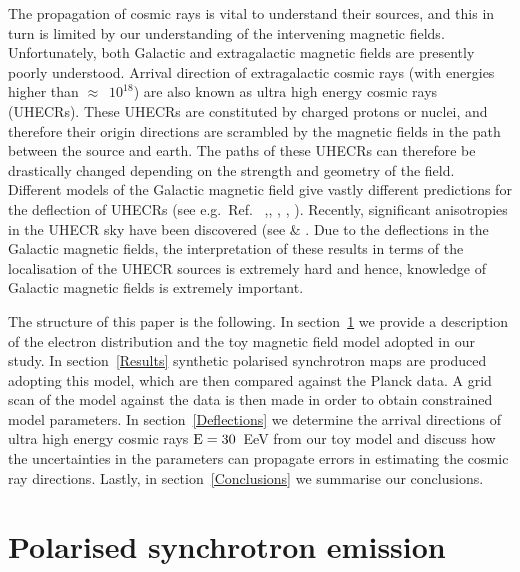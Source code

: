 \documentclass[usenatbib]{mnras}
\begin{document}
The propagation of cosmic rays is vital to understand their sources, and this in turn is limited by our understanding of the intervening magnetic fields. Unfortunately, both Galactic and extragalactic magnetic fields are presently poorly understood. Arrival direction of extragalactic cosmic rays (with energies higher than $\approx$~$10^{18}$) are also known as ultra high energy cosmic rays (UHECRs). These UHECRs are constituted by charged protons or nuclei, and therefore their origin directions are scrambled by the magnetic fields in the path between the source and earth. The paths of these UHECRs can therefore be drastically changed depending on the strength and geometry of the field. Different models of the Galactic magnetic field give vastly different predictions for the deflection of UHECRs (see e.g.~Ref.~ \cite{JF12},\cite{FARRAR_2014}, \cite{PT11_2011}, \cite{Sun_2008}, \cite{Sun_2010}). Recently, significant anisotropies in the UHECR sky have been discovered (see \cite{ICRC_2021} \cite{Auger_Starburst2018} \& \cite{ICRC_2019}. Due to the deflections in the Galactic magnetic fields, the interpretation of these results in terms of the localisation of the UHECR sources is extremely hard and hence, knowledge of Galactic magnetic fields is extremely important. 



The structure of this paper is the following. In section~\ref{Methods} we provide a description of the electron distribution and the toy magnetic field model adopted in our study. In section~\ref{Results} synthetic polarised synchrotron maps are produced adopting this model, which are then compared against the Planck data. A grid scan of the model against the data is then made in order to obtain constrained model parameters. In section~\ref{Deflections} we determine the arrival directions of ultra high energy cosmic rays $\rm E = 30$~EeV from our toy model and discuss how the uncertainties in the parameters can propagate errors in estimating the cosmic ray directions. %
Lastly, in section~\ref{Conclusions} we summarise our conclusions.


\section{Polarised synchrotron emission}
\label{Methods}
\end{document}
